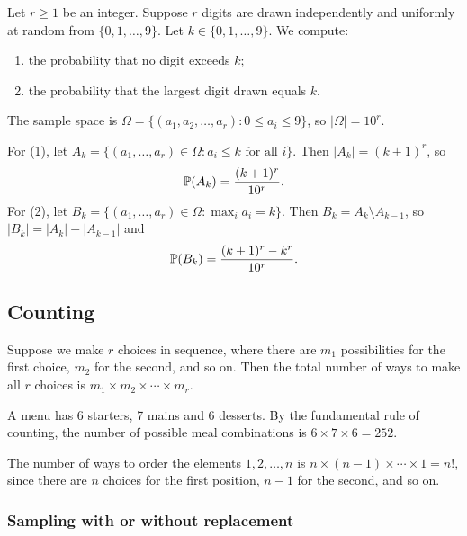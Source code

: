 \documentclass[a4paper]{article}
\begin{document}
\begin{eg}
  Let $r \geq 1$ be an integer. Suppose $r$ digits are drawn independently and uniformly at random from $\{0, 1, \dotsc, 9\}$. Let $k \in \{0, 1, \dotsc, 9\}$. We compute:
  \begin{enumerate}
    \item the probability that no digit exceeds $k$;
    \item the probability that the largest digit drawn equals $k$.
  \end{enumerate}

  The sample space is $\Omega = \{(a_1, a_2, \dotsc, a_r): 0 \leq a_i \leq 9\}$, so $|\Omega| = 10^r$.

  For (1), let $A_k = \{(a_1, \dotsc, a_r) \in \Omega : a_i \leq k \text{ for all } i\}$. Then $|A_k| = (k + 1)^r$, so
  \[
    \P(A_k) = \frac{(k + 1)^r}{10^r}.
  \]
  For (2), let $B_k = \{(a_1, \dotsc, a_r) \in \Omega : \max_i a_i = k\}$. Then $B_k = A_k \setminus A_{k-1}$, so $|B_k| = |A_k| - |A_{k - 1}|$ and
  \[
    \P(B_k) = \frac{(k + 1)^r - k^r}{10^r}.
  \]
\end{eg}
\subsection{Counting}

\begin{thm}
  Suppose we make $r$ choices in sequence, where there are $m_1$ possibilities for the first choice, $m_2$ for the second, and so on. Then the total number of ways to make all $r$ choices is $m_1\times m_2\times \cdots \times m_r$.
\end{thm}

\begin{eg}
  A menu has 6 starters, 7 mains and 6 desserts. By the fundamental rule of counting, the number of possible meal combinations is $6 \times 7 \times 6 = 252$.
\end{eg}

\begin{eg}[Permutations]
  The number of ways to order the elements $1, 2, \dotsc, n$ is $n\times (n - 1)\times\cdots \times 1 = n!$, since there are $n$ choices for the first position, $n-1$ for the second, and so on.
\end{eg}

\subsubsection*{Sampling with or without replacement}
\end{document}
